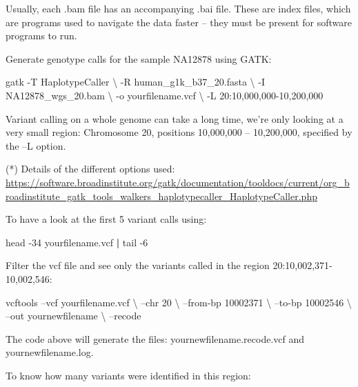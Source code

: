 \documentclass[]{book}
\newenvironment{Shaded}{\begin{snugshade}}{\end{snugshade}}
\newcommand{\KeywordTok}[1]{\textcolor[rgb]{0.13,0.29,0.53}{\textbf{#1}}}
\newcommand{\FunctionTok}[1]{\textcolor[rgb]{0.00,0.00,0.00}{#1}}
\newcommand{\ExtensionTok}[1]{#1}
\newcommand{\NormalTok}[1]{#1}
\begin{document}
Usually, each .bam file has an accompanying .bai file. These are index
files, which are programs used to navigate the data faster -- they must
be present for software programs to run.

Generate genotype calls for the sample NA12878 using GATK:

\begin{Shaded}
\begin{Highlighting}[]
\ExtensionTok{gatk}\NormalTok{ -T HaplotypeCaller \textbackslash{}}
\NormalTok{-R human_g1k_b37_20.fasta \textbackslash{}}
\NormalTok{-I NA12878_wgs_20.bam \textbackslash{}}
\NormalTok{-o yourfilename.vcf \textbackslash{}}
\NormalTok{-L 20:10,000,000-10,200,000}
\end{Highlighting}
\end{Shaded}

Variant calling on a whole genome can take a long time, we're only
looking at a very small region: Chromosome 20, positions 10,000,000 --
10,200,000, specified by the --L option.

(*) Details of the different options used:
\url{https://software.broadinstitute.org/gatk/documentation/tooldocs/current/org_broadinstitute_gatk_tools_walkers_haplotypecaller_HaplotypeCaller.php}

To have a look at the first 5 variant calls using:

\begin{Shaded}
\begin{Highlighting}[]
\FunctionTok{head}\NormalTok{ -34 yourfilename.vcf }\KeywordTok{|} \FunctionTok{tail}\NormalTok{ -6}
\end{Highlighting}
\end{Shaded}

Filter the vcf file and see only the variants called in the region
20:10,002,371-10,002,546:

\begin{Shaded}
\begin{Highlighting}[]
\ExtensionTok{vcftools}\NormalTok{ --vcf yourfilename.vcf \textbackslash{}}
\NormalTok{--chr 20 \textbackslash{}}
\NormalTok{--from-bp 10002371 \textbackslash{}}
\NormalTok{--to-bp 10002546 \textbackslash{}}
\NormalTok{--out yournewfilename \textbackslash{}}
\NormalTok{--recode}
\end{Highlighting}
\end{Shaded}

The code above will generate the files: yournewfilename.recode.vcf and
yournewfilename.log.

To know how many variants were identified in this region:
\end{document}
